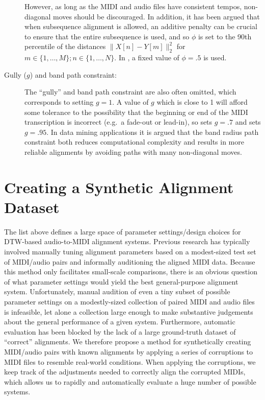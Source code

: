 \begin{description}
However, as long as the MIDI and audio files have consistent tempos, non-diagonal moves should be discouraged.
In addition, it has been argued \cite{raffel2015large} that when subsequence alignment is allowed, an additive penalty can be crucial to ensure that the entire subsequence is used, and so $\phi$ is set to the 90th percentile of the distances $\|X[n] - Y[m]\|_2^2$ for $m \in \{1, \ldots, M\}; n \in \{1, \ldots, N\}$.
In \cite{ellis2013aligning}, a fixed value of $\phi = .5$ is used.
\item[Gully ($g$) and band path constraint:] The ``gully'' and band path constraint are also often omitted, which corresponds to setting $g = 1$.
A value of $g$ which is close to 1 will afford some tolerance to the possibility that the beginning or end of the MIDI transcription is incorrect (e.g.\ a fade-out or lead-in), so \cite{ellis2013aligning} sets $g = .7$ and \cite{raffel2015large} sets $g = .95$.
In data mining applications \cite{ratanamahatana2004everything} it is argued that the band radius path constraint both reduces computational complexity and results in more reliable alignments by avoiding paths with many non-diagonal moves.
\end{description}

\section{Creating a Synthetic Alignment Dataset}
\label{sec:synthetic}

The list above defines a large space of parameter settings/design choices for DTW-based audio-to-MIDI alignment systems.
Previous research has typically involved manually tuning alignment parameters based on a modest-sized test set of MIDI/audio pairs and informally auditioning the aligned MIDI data.
Because this method only facilitates small-scale comparisons, there is an obvious question of what parameter settings would yield the best general-purpose alignment system.
Unfortunately, manual audition of even a tiny subset of possible parameter settings on a modestly-sized collection of paired MIDI and audio files is infeasible, let alone a collection large enough to make substantive judgements about the general performance of a given system.
Furthermore, automatic evaluation has been blocked by the lack of a large ground-truth dataset of ``correct'' alignments.
We therefore propose a method for synthetically creating MIDI/audio pairs with known alignments by applying a series of corruptions to MIDI files to resemble real-world conditions.
When applying the corruptions, we keep track of the adjustments needed to correctly align the corrupted MIDIs, which allows us to rapidly and automatically evaluate a huge number of possible systems.

